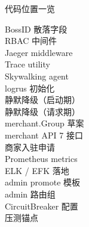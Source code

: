 \documentclass[aspectratio=169,11pt]{beamer}
\begin{document}
\begin{frame}[allowframebreaks]{代码位置一览}
\scriptsize
\begin{description}
  \item[BossID 散落字段]
  \item[RBAC 中间件]
  \item[Jaeger middleware]
  \item[Trace utility]
  \item[Skywalking agent]
  \item[logrus 初始化]
  \item[静默降级（启动期）]
  \item[静默降级（请求期）]
  \item[merchant.Group 草案]
  \item[merchant API 7 接口]
  \item[商家入驻申请]
  \item[Prometheus metrics]
  \item[ELK / EFK 落地]
  \item[admin promote 模板]
  \item[admin 路由组]
  \item[CircuitBreaker 配置]
  \item[压测锚点]
\end{description}
\vspace{1mm}
\end{frame}
\end{document}

